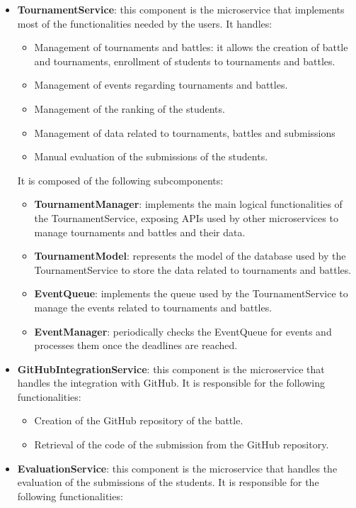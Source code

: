 \begin{itemize}
    \item \textbf{TournamentService}: this component is the microservice that implements most of the functionalities needed by the users. It handles:
    \begin{itemize}
        \item Management of tournaments and battles: it allows the creation of battle and tournaments, enrollment of students to tournaments and battles.
        \item Management of events regarding tournaments and battles.
        \item Management of the ranking of the students.
        \item Management of data related to tournaments, battles and submissions
        \item Manual evaluation of the submissions of the students.
    \end{itemize}
    It is composed of the following subcomponents:
    \begin{itemize}
        \item \textbf{TournamentManager}: implements the main logical functionalities of the TournamentService, exposing APIs used by other microservices to manage tournaments and battles and their data.
        \item \textbf{TournamentModel}: represents the model of the database used by the TournamentService to store the data related to tournaments and battles.
        \item \textbf{EventQueue}: implements the queue used by the TournamentService to manage the events related to tournaments and battles.
        \item \textbf{EventManager}: periodically checks the EventQueue for events and processes them once the deadlines are reached.
    \end{itemize}
    \item \textbf{GitHubIntegrationService}: this component is the microservice that handles the integration with GitHub. It is responsible for the following functionalities:
    \begin{itemize}
        \item Creation of the GitHub repository of the battle.
        \item Retrieval of the code of the submission from the GitHub repository.
    \end{itemize}
    \item \textbf{EvaluationService}: this component is the microservice that handles the evaluation of the submissions of the students. It is responsible for the following functionalities:

\end{itemize}
